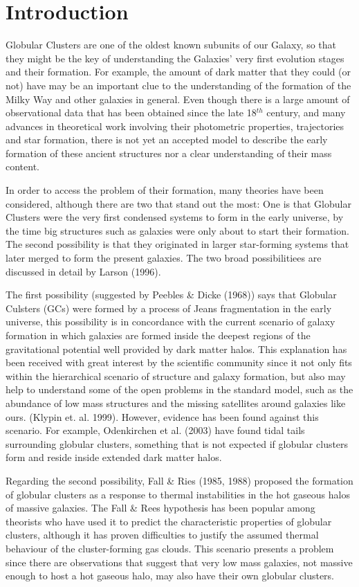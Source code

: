 \chapter{Introduction}

Globular Clusters are one of the oldest known subunits of our Galaxy, so that they might be the key of understanding the Galaxies' very first evolution stages and their formation. For example, the amount of dark matter that they could (or not) have may be an important clue to the understanding of the formation of the Milky Way and other galaxies in general. Even though there is a large amount of observational data that has been obtained since the late 18$^{th}$ century, and many advances in theoretical work involving their photometric properties, trajectories and star formation, there is not yet an accepted model to describe the early formation of these ancient structures nor a clear understanding of their mass content. 

In order to access the problem of their formation, many theories have been considered, although there are two that stand out the most: One is that Globular Clusters were the very first condensed systems to form in the early universe, by the time big structures such as galaxies were only about to start their formation. The second possibility is that they originated in larger star-forming systems that later merged to form the present galaxies. The two broad possibilitiees are discussed in detail by Larson (1996).

The first possibility (suggested by Peebles \& Dicke (1968)) says that Globular Culsters (GCs) were formed by a process of Jeans fragmentation in the early universe, this possibility is in concordance with the current scenario of galaxy formation in which galaxies are formed inside the deepest regions of the gravitational potential well provided by dark matter halos. This explanation has been received with great interest by the scientific community since it not only fits within the hierarchical scenario of structure and galaxy formation, but also may help to understand some of the open problems in the standard model, such as the abundance of low mass structures and the missing satellites around galaxies like ours. (Klypin et. al. 1999). However, evidence has been found against this scenario. For example, Odenkirchen et al. (2003) have found tidal tails surrounding globular clusters, something that is not expected if globular clusters form and reside inside extended dark matter halos.

Regarding the second possibility, Fall \& Ries (1985, 1988) proposed the formation of globular clusters as a response to thermal instabilities in the hot gaseous halos of massive galaxies. The Fall \& Rees hypothesis has been popular among theorists who have used it to predict the characteristic properties of globular clusters, although it has proven difficulties to justify the assumed thermal behaviour of the cluster-forming gas clouds. This scenario presents a problem since there are observations that suggest that very low mass galaxies, not massive enough to host a hot gaseous halo, may also have their own globular clusters.

